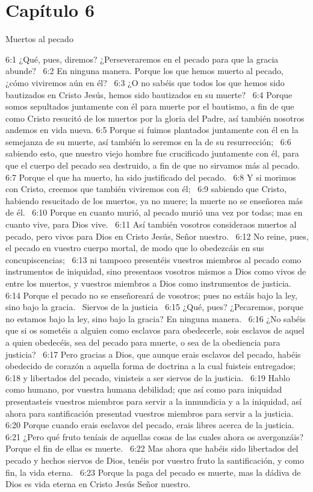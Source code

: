 \section*{Capítulo 6}
Muertos al pecado  

6:1 ¿Qué, pues, diremos? ¿Perseveraremos en el pecado para que la gracia abunde?  
6:2 En ninguna manera. Porque los que hemos muerto al pecado, ¿cómo viviremos aún en él?  
6:3 ¿O no sabéis que todos los que hemos sido bautizados en Cristo Jesús, hemos sido bautizados en su muerte?  
6:4 Porque somos sepultados juntamente con él para muerte por el bautismo, a fin de que como Cristo resucitó de los muertos por la gloria del Padre, así también nosotros andemos en vida nueva. 
6:5 Porque si fuimos plantados juntamente con él en la semejanza de su muerte, así también lo seremos en la de su resurrección;  
6:6 sabiendo esto, que nuestro viejo hombre fue crucificado juntamente con él, para que el cuerpo del pecado sea destruido, a fin de que no sirvamos más al pecado.  
6:7 Porque el que ha muerto, ha sido justificado del pecado.  
6:8 Y si morimos con Cristo, creemos que también viviremos con él;  
6:9 sabiendo que Cristo, habiendo resucitado de los muertos, ya no muere; la muerte no se enseñorea más de él.  
6:10 Porque en cuanto murió, al pecado murió una vez por todas; mas en cuanto vive, para Dios vive.  
6:11 Así también vosotros consideraos muertos al pecado, pero vivos para Dios en Cristo Jesús, Señor nuestro.  
6:12 No reine, pues, el pecado en vuestro cuerpo mortal, de modo que lo obedezcáis en sus concupiscencias;  
6:13 ni tampoco presentéis vuestros miembros al pecado como instrumentos de iniquidad, sino presentaos vosotros mismos a Dios como vivos de entre los muertos, y vuestros miembros a Dios como instrumentos de justicia.  
6:14 Porque el pecado no se enseñoreará de vosotros; pues no estáis bajo la ley, sino bajo la gracia.  
Siervos de la justicia  
6:15 ¿Qué, pues? ¿Pecaremos, porque no estamos bajo la ley, sino bajo la gracia? En ninguna manera.  
6:16 ¿No sabéis que si os sometéis a alguien como esclavos para obedecerle, sois esclavos de aquel a quien obedecéis, sea del pecado para muerte, o sea de la obediencia para justicia?  
6:17 Pero gracias a Dios, que aunque erais esclavos del pecado, habéis obedecido de corazón a aquella forma de doctrina a la cual fuisteis entregados;  
6:18 y libertados del pecado, vinisteis a ser siervos de la justicia.  
6:19 Hablo como humano, por vuestra humana debilidad; que así como para iniquidad presentasteis vuestros miembros para servir a la inmundicia y a la iniquidad, así ahora para santificación presentad vuestros miembros para servir a la justicia.  
6:20 Porque cuando erais esclavos del pecado, erais libres acerca de la justicia.  
6:21 ¿Pero qué fruto teníais de aquellas cosas de las cuales ahora os avergonzáis? Porque el fin de ellas es muerte.  
6:22 Mas ahora que habéis sido libertados del pecado y hechos siervos de Dios, tenéis por vuestro fruto la santificación, y como fin, la vida eterna.  
6:23 Porque la paga del pecado es muerte, mas la dádiva de Dios es vida eterna en Cristo Jesús Señor nuestro.  
